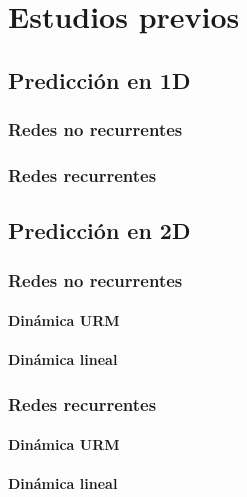 \chapter{Estudios previos}\label{cap.previos}
\section{Predicción en 1D}
\subsection{Redes no recurrentes}
\subsection{Redes recurrentes}

\section{Predicción en 2D}
\subsection{Redes no recurrentes}
\subsubsection{Dinámica URM}
\subsubsection{Dinámica lineal}
\subsection{Redes recurrentes}
\subsubsection{Dinámica URM}
\subsubsection{Dinámica lineal}


